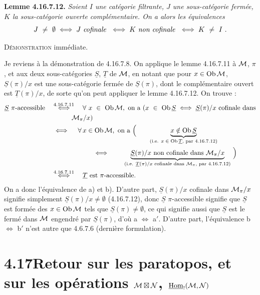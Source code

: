 \noindent\textbf{Lemme 4.16.7.12.} \textit{Soient $I$ une catégorie filtrante, $J$ une sous-catégorie fermée, $K$ la sous-catégorie ouverte complémentaire. On a alors les équivalences}
\[
J \ \neq \ \emptyset \iff J \text{ \textit{cofinale} } \iff K \text{ \textit{non cofinale} } \iff K \ \neq \ I \ .
\]

\noindent\textsc{Démonstration} immédiate.

\noindent Je reviens à la démonstration de 4.16.7.8. On applique le lemme 4.16.7.11 à $\mathcal{M}$, $\pi$, et aux deux
sous-catégories $\underline{S}$, $\underline{T}$ de $\mathcal{M}$, en notant que pour $x\in\operatorname{Ob}\mathcal{M}$, $\underline{S}(\pi)/x$ est une sous-catégorie fermée de $\underline{S}(\pi)$, dont le complémentaire ouvert est $\underline{T}(\pi)/x$, de sorte qu'on peut appliquer le lemme 4.16.7.12. On trouve :
\[
\begin{aligned}
\underline{S}\ \pi\text{-accessible} \quad &\overset{4.16.7.11}{\iff} \quad \forall\ x\ \in\ \Ob\cM,\ \text{on a } (x\ \in\ \Ob\underline{S}\iff\underline{S}(\pi)/x \text{ cofinale dans}\\
&\qquad\quad \cM_\pi/x)\\
&\iff \quad \forall\, x\in\Ob\cM,\ \text{on a } \Bigl( \qquad \underbrace{x\notin\Ob\underline{S}}_{\text{(i.e. $x\in\Ob\underline{T}$, par 4.16.7.12)}}\\
&\qquad\qquad\qquad \iff \qquad \underbrace{\underline{S}(\pi)/x \text{ non cofinale dans } \cM_\pi/x}_{\text{(i.e. $\underline{T}(\pi)/x$ cofinale dans $\cM_\pi$, par 4.16.7.12)}} \ \Bigr)\\
&\overset{4.16.7.11}{\iff} \quad \underline{T} \text{ est } \pi\text{-accessible.}
\end{aligned}
\]
On a donc l'équivalence de a) et b). D'autre part, $\underline{S}(\pi)/x$ cofinale dans $\mathcal{M}_\pi/x$ signifie simplement $\underline{S}(\pi)/x\neq\emptyset$ (4.16.7.12), donc $\underline{S}$ $\pi$-accessible signifie que $\underline{S}$ est formée des $x\in\operatorname{Ob}\mathcal{M}$ tels que $\underline{S}(\pi)\neq\emptyset$, ce qui signifie aussi que $\underline{S}$ est le fermé dans $\mathcal{M}$ engendré par $\underline{S}(\pi)$, d'où a $\iff$ a$'$. D'autre part, l'équivalence b $\iff$ b$'$ n'est autre que 4.6.7.6 (dernière formulation). %


\section*{4.17\quad Retour sur les paratopos, et sur les opérations $\mathcal{M}\boxtimes\mathcal{N}$, $\underline{\operatorname{Hom}}_{!}(\mathcal{M},\mathcal{N})$}

